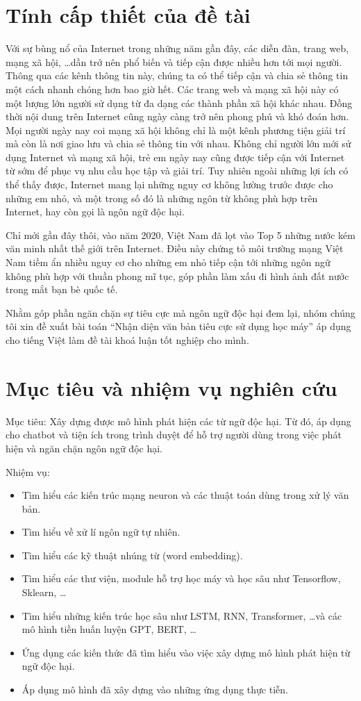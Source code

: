 \section{Tính cấp thiết của đề tài}
Với sự bùng nổ của Internet trong những năm gần đây, các diễn đàn, trang web, mạng xã hội, \dots dần trở nên phổ biến và tiếp cận được nhiều hơn tới mọi người. Thông qua các kênh thông tin này, chúng ta có thể tiếp cận và chia sẻ thông tin một cách nhanh chóng hơn bao giờ hết. Các trang web và mạng xã hội này có một lượng lớn người sử dụng từ đa dạng các thành phần xã hội khác nhau. Đồng thời nội dung trên Internet cũng ngày càng trở nên phong phú và khó đoán hơn. Mọi người ngày nay coi mạng xã hội không chỉ là một kênh phương tiện giải trí mà còn là nơi giao lưu và chia sẻ thông tin với nhau. Không chỉ người lớn mới sử dụng Internet và mạng xã hội, trẻ em ngày nay cũng được tiếp cận với Internet từ sớm để phục vụ nhu cầu học tập và giải trí. Tuy nhiên ngoài những lợi ích có thể thấy được, Internet mang lại những nguy cơ không lường trước được cho những em nhỏ, và một trong số đó là những ngôn từ không phù hợp trên Internet, hay còn gọi là ngôn ngữ độc hại.

Chỉ mới gần đây thôi, vào năm 2020, Việt Nam đã lọt vào Top 5 những nước kém văn minh nhất thế giới trên Internet. Điều này chứng tỏ môi trường mạng Việt Nam tiềm ẩn nhiều nguy cơ cho những em nhỏ tiếp cận tới những ngôn ngữ không phù hợp với thuần phong mĩ tục, góp phần làm xấu đi hình ảnh đất nước trong mắt bạn bè quốc tế.

Nhằm góp phần ngăn chặn sự tiêu cực mà ngôn ngữ độc hại đem lại, nhóm chúng tôi xin đề xuất bài toán ``Nhận diện văn bản tiêu cực sử dụng học máy'' áp dụng cho tiếng Việt làm đề tài khoá luận tốt nghiệp cho mình.

\section{Mục tiêu và nhiệm vụ nghiên cứu}
Mục tiêu: Xây dựng được mô hình phát hiện các từ ngữ độc hại. Từ đó, áp dụng cho chatbot và tiện ích trong trình duyệt để hỗ trợ người dùng trong việc phát hiện và ngăn chặn ngôn ngữ độc hại.

Nhiệm vụ:
\begin{itemize}
    \item Tìm hiểu các kiến trúc mạng neuron và các thuật toán dùng trong xử lý văn bản.
    \item Tìm hiểu về xử lí ngôn ngữ tự nhiên.
    \item Tìm hiểu các kỹ thuật nhúng từ (word embedding).
    \item Tìm hiểu các thư viện, module hỗ trợ học máy và học sâu như Tensorflow, Sklearn, \dots
    \item Tìm hiểu những kiến trúc học sâu như LSTM, RNN, Transformer, \dots và các mô hình tiền huấn luyện GPT, BERT, \dots
    \item Ứng dụng các kiến thức đã tìm hiểu vào việc xây dựng mô hình phát hiện từ ngữ độc hại.
    \item Áp dụng mô hình đã xây dựng vào những ứng dụng thực tiễn.
\end{itemize}

